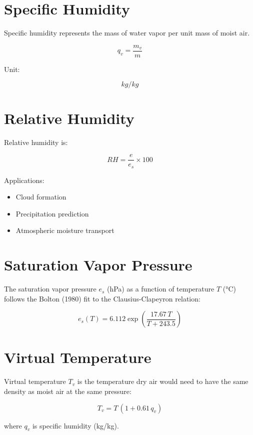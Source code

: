 \section{Specific Humidity}


Specific humidity represents the mass of water vapor per unit
mass of moist air.


\[
q_v=\frac{m_v}{m}
\]


Unit:

\[
kg/kg
\]



\section{Relative Humidity}


Relative humidity is:


\begin{equation}
RH=
\frac{e}{e_s}
\times100
\end{equation}


Applications:

\begin{itemize}

\item Cloud formation

\item Precipitation prediction

\item Atmospheric moisture transport

\end{itemize}



\section{Saturation Vapor Pressure}


The saturation vapor pressure $e_s$ (hPa) as a function of temperature
$T$ (\si{\celsius}) follows the Bolton (1980) fit to the
Clausius-Clapeyron relation:

\begin{equation}
e_s(T) = 6.112 \exp\left(\frac{17.67\,T}{T+243.5}\right)
\end{equation}



\section{Virtual Temperature}


Virtual temperature $T_v$ is the temperature dry air would need to have
the same density as moist air at the same pressure:

\begin{equation}
T_v = T\,(1 + 0.61\,q_v)
\end{equation}


where $q_v$ is specific humidity (kg/kg).
